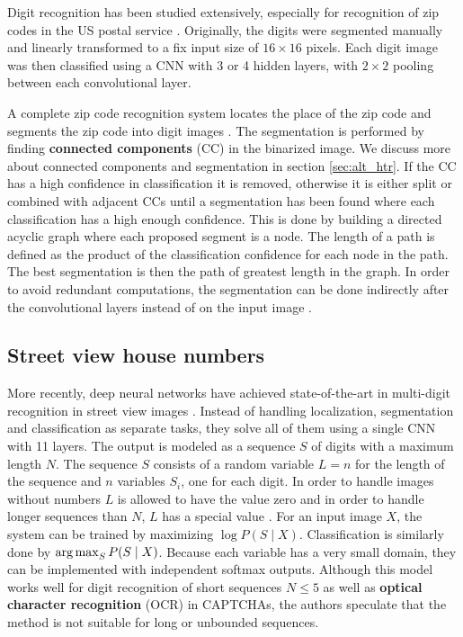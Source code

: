 Digit recognition has been studied extensively, especially for recognition of zip codes in the US postal service \cite{lecun_1989, lecun_1990}. Originally, the digits were segmented manually and linearly transformed to a fix input size of $16 \times 16$ pixels.
Each digit image was then classified using a CNN with 3 or 4 hidden layers, with $2 \times 2$ pooling between each convolutional layer.

A complete zip code recognition system locates the place of the zip code and segments the zip code into digit images \cite{zipcode_system}. The segmentation is performed by finding \textbf{connected components} (CC) in the binarized image. We discuss more about connected components and segmentation in section \ref{sec:alt_htr}.
If the CC has a high confidence in classification it is removed, otherwise it is either split or combined with adjacent CCs until a segmentation has been found where each classification has a high enough confidence. This is done by building a directed acyclic graph where each proposed segment is a node. The length of a path is defined as the product of the classification confidence for each node in the path. The best segmentation is then the path of greatest length in the graph. In order to avoid redundant computations, the segmentation can be done indirectly after the convolutional layers instead of on the input image \cite{lecun_multidigit}.

\subsection{Street view house numbers}


More recently, deep neural networks have achieved state-of-the-art in multi-digit recognition in street view images \cite{multidigit_streetview}. Instead of handling localization, segmentation and classification as separate tasks, they solve all of them using a single CNN with 11 layers. The output is modeled as a sequence $S$ of digits with a maximum length $N$. The sequence $S$ consists of a random variable $L=n$ for the length of the sequence and $n$ variables $S_i$, one for each digit. In order to handle images without numbers $L$ is allowed to have the value zero and in order to handle longer sequences than $N$, $L$ has a special value . For an input image $X$, the system can be trained by maximizing $\log P(S \mid X)$.
Classification is similarly done by $\operatorname*{arg\,max}_S P(S \mid X)$.
Because each variable has a very small domain, they can be implemented with independent softmax outputs.
Although this model works well for digit recognition of short sequences $N \leq 5$ as well as \textbf{optical character recognition} (OCR) in CAPTCHAs, the authors speculate that the method is not suitable for long or unbounded sequences.

